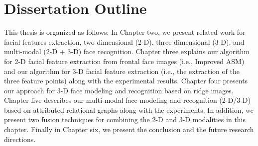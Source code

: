 \section{Dissertation Outline}
This thesis is organized as follows: In Chapter two, we present
related work for facial features extraction, two dimensional (2-D),
three dimensional (3-D), and multi-modal (2-D + 3-D) face
recognition. Chapter three explains our algorithm for 2-D facial
feature extraction from frontal face images (i.e., Improved ASM) and
our algorithm for 3-D facial feature extraction (i.e., the
extraction of the three feature points) along with the experimental
results. Chapter four presents our approach for 3-D face modeling
and recognition based on ridge images. Chapter five describes our
multi-modal face modeling and recognition (2-D/3-D) based on
attributed relational graphs along with the experiments. In
addition, we present two fusion techniques for combining the 2-D and
3-D modalities in this chapter. Finally in Chapter six, we present
the conclusion and the future research directions.
